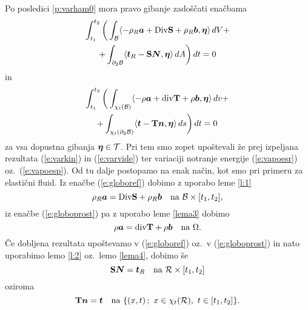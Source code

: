 Po posledici \ref{p:varham0} mora pravo gibanje zadoščati enačbama
\begin{multline} \label{e:globoref}
	\int_{t_1}^{t_2}\bigg( \int_{\mathcal B}\langle -\rho_R\boldsymbol a+
	\mathrm {Div}\mathbf S+\rho_R\boldsymbol b,\boldsymbol \eta\rangle \,dV+ \\
	+\int_{\partial_2 \mathcal B}\langle\boldsymbol t_R-\mathbf S\boldsymbol N,\boldsymbol \eta\rangle\,dA\bigg)\,dt=0
\end{multline}
in
\begin{multline} \label{e:globoprost}
	\int_{t_1}^{t_2}\bigg( \int_{\chi_t(\mathcal B)}\langle -\rho\boldsymbol a+
	\mathrm{div}\mathbf T+\rho\boldsymbol b,\boldsymbol \eta\rangle\,dv+ \\
	+\int_{\chi_t(\partial_2 \mathcal B)}\langle\boldsymbol t-\mathbf T\boldsymbol n,\boldsymbol \eta\rangle\,ds\bigg)\,dt=0
\end{multline}
za vsa dopustna gibanja $\boldsymbol \eta\in\mathcal{T}$. Pri tem smo zopet upoštevali
že prej izpeljana rezultata (\ref{e:varkin}) in (\ref{e:varvide}) ter
variaciji notranje energije (\ref{e:vapoesr}) oz.~(\ref{e:vapoesp}).
Od tu dalje postopamo na enak način, kot smo pri primeru za elastični fluid.
Iz enačbe (\ref{e:globoref}) dobimo z uporabo leme \ref{l:1}
\begin{equation*}
	\rho_R\vek{a}=\Div\ten{S}+\rho_R\vek{b}\quad\textrm{na}\ \B\times[t_1,t_2],
\end{equation*}
iz enačbe (\ref{e:globoprost}) pa z uporabo leme \ref{lema3} dobimo
\begin{equation*}
	\rho\vek{a}=\div\ten{T}+\rho\vek{b}\quad\textrm{na}\ \Omega.
\end{equation*}
Če dobljena rezultata upoštevamo v (\ref{e:globoref}) oz.~v (\ref{e:globoprost}) in
nato uporabimo lemo \ref{l:2} oz.~lemo \ref{lema4}, dobimo še
\begin{equation*}
	\ten{S}\vek{N}=\vek{t}_R\quad\textrm{na}\ \mathcal{R}\times[t_1,t_2]
\end{equation*}
oziroma
\begin{equation*}
	\ten{T}\vek{n}=\vek{t}\quad\textrm{na}\ \{(x,t)\,;\ x\in\chi_t(\mathcal{R}),\ t\in[t_1,t_2] \}.
\end{equation*}